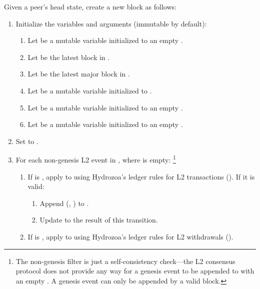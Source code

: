 \documentclass[../hydrozoa.tex]{subfiles}
\begin{document}
Given a peer's head state, create a new block as follows:
\begin{enumerate}
  \item Initialize the variables and arguments (immutable by default):
    \begin{enumerate}
      \item Let  be a mutable variable initialized to an empty .
      \item Let  be the latest block in .
      \item Let  be the latest major block in .
      \item Let  be a mutable variable initialized to .
      \item Let  be a mutable variable initialized to an empty .
      \item Let  be a mutable variable initialized to an empty .
    \end{enumerate}
  \item Set  to .
  \item For each non-genesis L2 event  in , where  is empty:%
    \footnote{The non-genesis filter is just a self-consistency check---the L2 consensus protocol does not provide any way for a genesis event to be appended to  with an empty .
      A genesis event can only be appended by a valid block.
      }
      \begin{enumerate}
        \item If  is , apply  to  using Hydrozoa's ledger rules for L2 transactions ().
          If it is valid:
          \begin{enumerate}
            \item Append (, ) to .
            \item Update  to the result of this transition.
          \end{enumerate}
        \item If  is , apply  to  using Hydrozoa's ledger rules for L2 withdrawals ().

\end{enumerate}
\end{enumerate}
\end{document}

